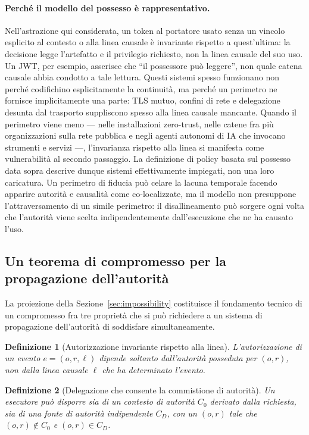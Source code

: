 \documentclass[11pt]{article}
\newtheorem{definition}{Definizione}
\begin{document}
\paragraph{Perché il modello del possesso è rappresentativo.}
Nell'astrazione qui considerata, un token al portatore usato senza un vincolo
esplicito al contesto o alla linea causale è invariante rispetto a quest'ultima:
la decisione legge l'artefatto e il privilegio richiesto, non la linea causale
del suo uso. Un JWT, per esempio, asserisce che ``il possessore può leggere'',
non quale catena causale abbia condotto a tale lettura. Questi sistemi spesso
funzionano non perché codifichino esplicitamente la continuità, ma perché un
perimetro ne fornisce implicitamente una parte: TLS mutuo, confini di rete e
delegazione desunta dal trasporto suppliscono spesso alla linea causale mancante.
Quando il perimetro viene meno --- nelle installazioni zero-trust, nelle catene
fra più organizzazioni sulla rete pubblica e negli agenti autonomi di IA che
invocano strumenti e servizi ---, l'invarianza rispetto alla linea si manifesta
come vulnerabilità al secondo passaggio. La definizione di policy basata sul
possesso data sopra descrive dunque sistemi effettivamente impiegati, non una
loro caricatura. Un perimetro di fiducia può celare la lacuna temporale facendo
apparire autorità e causalità come co-localizzate, ma il modello non presuppone
l'attraversamento di un simile perimetro: il disallineamento può sorgere ogni
volta che l'autorità viene scelta indipendentemente dall'esecuzione che ne ha
causato l'uso.

\subsection{Un teorema di compromesso per la propagazione dell'autorità}

La proiezione della Sezione~\ref{sec:impossibility} costituisce il fondamento
tecnico di un compromesso fra tre proprietà che si può richiedere a un sistema
di propagazione dell'autorità di soddisfare simultaneamente.

\begin{definition}[Autorizzazione invariante rispetto alla linea]
L'autorizzazione di un evento $e = (o,r,\ell)$ dipende soltanto dall'autorità
posseduta per $(o,r)$, non dalla linea causale $\ell$ che ha determinato
l'evento.
\end{definition}

\begin{definition}[Delegazione che consente la commistione di autorità]
Un esecutore può disporre sia di un contesto di autorità $C_0$ derivato dalla
richiesta, sia di una fonte di autorità indipendente $C_D$, con un $(o,r)$ tale
che
$(o,r) \notin C_0$ e $(o,r) \in C_D$.
\end{definition}
\end{document}
